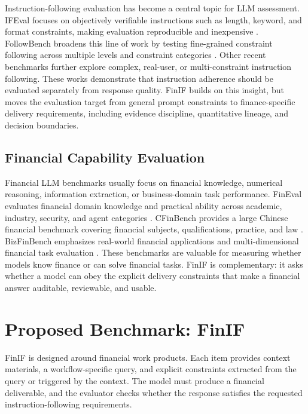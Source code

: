 \documentclass[11pt]{article}
\begin{document}
Instruction-following evaluation has become a central topic for LLM assessment. IFEval focuses on objectively verifiable instructions such as length, keyword, and format constraints, making evaluation reproducible and inexpensive \citep{zhou2023ifeval}. FollowBench broadens this line of work by testing fine-grained constraint following across multiple levels and constraint categories \citep{jiang2024followbench}. Other recent benchmarks further explore complex, real-user, or multi-constraint instruction following. These works demonstrate that instruction adherence should be evaluated separately from response quality. FinIF builds on this insight, but moves the evaluation target from general prompt constraints to finance-specific delivery requirements, including evidence discipline, quantitative lineage, and decision boundaries.

\subsection{Financial Capability Evaluation}

Financial LLM benchmarks usually focus on financial knowledge, numerical reasoning, information extraction, or business-domain task performance. FinEval evaluates financial domain knowledge and practical ability across academic, industry, security, and agent categories \citep{guo2023fineval}. CFinBench provides a large Chinese financial benchmark covering financial subjects, qualifications, practice, and law \citep{nie2024cfinbench}. BizFinBench emphasizes real-world financial applications and multi-dimensional financial task evaluation \citep{lu2025bizfinbench}. These benchmarks are valuable for measuring whether models know finance or can solve financial tasks. FinIF is complementary: it asks whether a model can obey the explicit delivery constraints that make a financial answer auditable, reviewable, and usable.

\section{Proposed Benchmark: FinIF}

FinIF is designed around financial work products. Each item provides context materials, a workflow-specific query, and explicit constraints extracted from the query or triggered by the context. The model must produce a financial deliverable, and the evaluator checks whether the response satisfies the requested instruction-following requirements.
\end{document}
